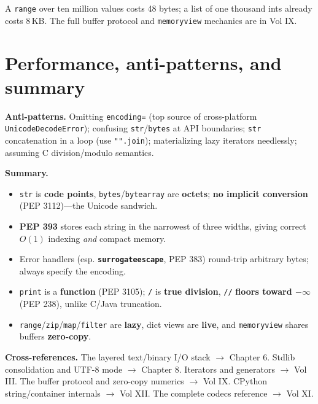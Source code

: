 A \texttt{range} over ten million values costs 48 bytes; a list of one thousand ints already costs
8\,KB. The full buffer protocol and \texttt{memoryview} mechanics are in Vol IX.

\section{Performance, anti-patterns, and summary}

\textbf{Anti-patterns.} Omitting \texttt{encoding=} (top source of cross-platform
\texttt{UnicodeDecodeError}); confusing \texttt{str}/\texttt{bytes} at API boundaries; \texttt{str}
concatenation in a loop (use \texttt{"".join}); materializing lazy iterators needlessly; assuming
C division/modulo semantics.

\textbf{Summary.}
\begin{itemize}
  \item \texttt{str} is \textbf{code points}, \texttt{bytes}/\texttt{bytearray} are
    \textbf{octets}; \textbf{no implicit conversion} (PEP 3112)---the Unicode sandwich.
  \item \textbf{PEP 393} stores each string in the narrowest of three widths, giving correct
    $O(1)$ indexing \emph{and} compact memory.
  \item Error handlers (esp. \textbf{\texttt{surrogateescape}}, PEP 383) round-trip arbitrary
    bytes; always specify the encoding.
  \item \texttt{print} is a \textbf{function} (PEP 3105); \texttt{/} is \textbf{true division},
    \texttt{//} \textbf{floors toward $-\infty$} (PEP 238), unlike C/Java truncation.
  \item \texttt{range}/\texttt{zip}/\texttt{map}/\texttt{filter} are \textbf{lazy}, dict views are
    \textbf{live}, and \texttt{memoryview} shares buffers \textbf{zero-copy}.
\end{itemize}

\textbf{Cross-references.} The layered text/binary I/O stack $\rightarrow$ Chapter 6. Stdlib
consolidation and UTF-8 mode $\rightarrow$ Chapter 8. Iterators and generators $\rightarrow$
Vol III. The buffer protocol and zero-copy numerics $\rightarrow$ Vol IX. CPython string/container
internals $\rightarrow$ Vol XII. The complete codecs reference $\rightarrow$ Vol XI.
